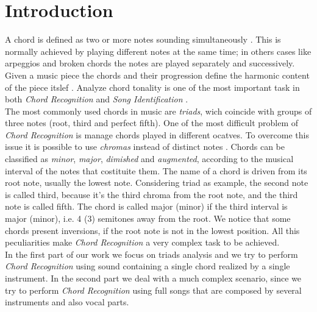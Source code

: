\section{Introduction}
\label{sec:intro}

A chord is defined as two or more notes sounding simultaneously \cite{benward2014music}. This is normally achieved by playing different notes at the same time; in others cases like arpeggios and broken chords the notes are played separately and successively. Given a music piece the chords and their progression define the harmonic content of the piece itslef \cite{papadopoulos2007large}. Analyze chord tonality is one of the most important task in both \textit{Chord Recognition} and \textit{Song Identification} \cite{lee2006identifying}.\\
%
The most commonly used chords in music are \textit{triads}, wich coincide with groups of three notes (root, third and perfect fifth). One of the most difficult problem of \textit{Chord Recognition} is manage chords played in different ocatves. To overcome this issue it is possible to use \textit{chromas} instead of distinct notes \cite{bartsch2005audio}. Chords can be classified as \textit{minor}, \textit{major}, \textit{dimished} and \textit{augmented}, according to the musical interval of the notes that costituite them. The name of a chord is driven from its root note, usually the lowest note. Considering triad as example, the second note is called third, because it's the third chroma from the root note, and the third note is called fifth. The chord is called major (minor) if the third interval is major (minor), i.e. 4 (3) semitones away from the root. We notice that some chords present inversions, if the root note is not in the lowest position. All this peculiarities make \textit{Chord Recognition} a very complex task to be achieved. \\
%
In the first part of our work we focus on triads analysis and we try to perform \textit{Chord Recognition} using sound containing a single chord realized by a single instrument. In the second part we deal with a much complex scenario, since we try to perform \textit{Chord Recognition} using full songs that are composed by several instruments and also vocal parts.
